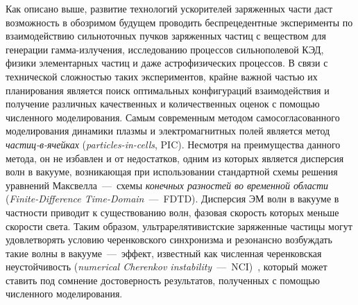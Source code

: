 Как описано выше, развитие технологий ускорителей заряженных части даст возможность в обозримом будущем проводить беспрецедентные эксперименты по взаимодействию сильноточных пучков заряженных частиц с веществом для генерации гамма-излучения, исследованию процессов сильнополевой КЭД, физики элементарных частиц и даже астрофизических процессов.
В связи с технической сложностью таких экспериментов, крайне важной частью их планирования является поиск оптимальных конфигураций взаимодействия и получение различных качественных и количественных оценок с помощью численного моделирования.
Самым современным методом самосогласованного моделирования динамики плазмы и электромагнитных полей является метод \textit{частиц-в-ячейках} (\textit{particles-in-cells}, PIC).
Несмотря на преимущества данного метода, он не избавлен и от недостатков, одним из которых является дисперсия волн в вакууме, возникающая при использовании стандартной схемы решения уравнений Максвелла~---~схемы \textit{конечных разностей во временной области} (\textit{Finite-Difference Time-Domain}~---~FDTD).
Дисперсия ЭМ волн в вакууме в частности приводит к существованию волн, фазовая скорость которых меньше скорости света.
Таким образом, ультрарелятивистские заряженные частицы могут удовлетворять условию черенковского синхронизма и резонансно возбуждать такие волны в вакууме~---~эффект, известный как {численная черенковская неустойчивость} (\textit{numerical Cherenkov instability}~---~NCI)~\cite{Birdsall1989, Meyers2014, Blinne2017}, который может ставить под сомнение достоверность результатов, полученных с помощью численного моделирования.

